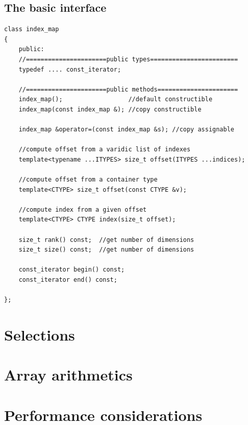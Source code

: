 \subsection{The basic interface}

\begin{verbatim}
class index_map
{
    public:
    //======================public types========================
    typedef .... const_iterator;

    //======================public methods======================
    index_map();                  //default constructible
    index_map(const index_map &); //copy constructible 

    index_map &operator=(const index_map &s); //copy assignable 

    //compute offset from a varidic list of indexes
    template<typename ...ITYPES> size_t offset(ITYPES ...indices);

    //compute offset from a container type
    template<CTYPE> size_t offset(const CTYPE &v);

    //compute index from a given offset
    template<CTYPE> CTYPE index(size_t offset);

    size_t rank() const;  //get number of dimensions
    size_t size() const;  //get number of dimensions
    
    const_iterator begin() const; 
    const_iterator end() const; 

};
\end{verbatim}

\section{Selections}

\section{Array arithmetics}

\section{Performance considerations}

